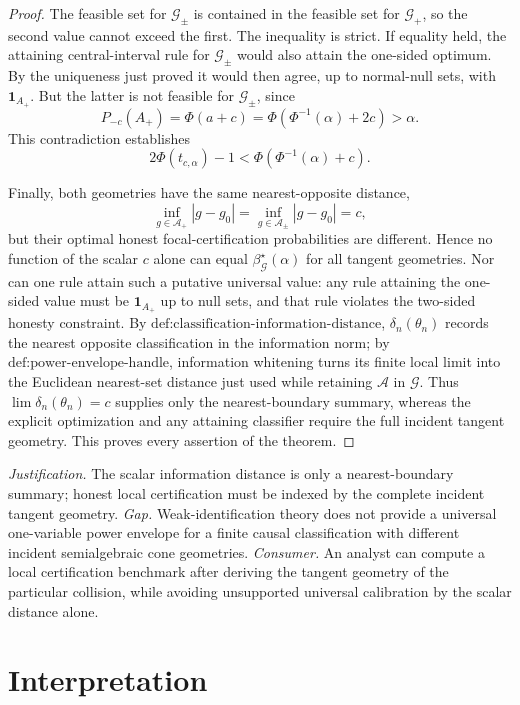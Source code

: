 \documentclass{article}
\begin{document}
\begin{proof}
The feasible set for \(\mathcal G_{\pm}\) is contained in the feasible set for \(\mathcal G_+\), so the second value cannot exceed the first.  The inequality is strict.  If equality held, the attaining central-interval rule for \(\mathcal G_{\pm}\) would also attain the one-sided optimum.  By the uniqueness just proved it would then agree, up to normal-null sets, with \(\mathbf 1_{A_+}\).  But the latter is not feasible for \(\mathcal G_{\pm}\), since
\[
 P_{-c}(A_+)
 =\Phi(a+c)
 =\Phi\!\left(\Phi^{-1}(\alpha)+2c\right)
 >\alpha.
\]
This contradiction establishes
\[
 2\Phi(t_{c,\alpha})-1
 <\Phi\!\left(\Phi^{-1}(\alpha)+c\right).
\]

Finally, both geometries have the same nearest-opposite distance,
\[
 \inf_{g\in\mathcal A_+}|g-g_0|
 =\inf_{g\in\mathcal A_{\pm}}|g-g_0|=c,
\]
but their optimal honest focal-certification probabilities are different.  Hence no function of the scalar \(c\) alone can equal \(\beta^{\star}_{\mathcal G}(\alpha)\) for all tangent geometries.  Nor can one rule attain such a putative universal value: any rule attaining the one-sided value must be \(\mathbf 1_{A_+}\) up to null sets, and that rule violates the two-sided honesty constraint.  By \(\text{def:classification-information-distance}\), \(\delta_n(\theta_n)\) records the nearest opposite classification in the information norm; by \(\text{def:power-envelope-handle}\), information whitening turns its finite local limit into the Euclidean nearest-set distance just used while retaining \(\mathcal A\) in \(\mathcal G\).  Thus \(\lim\delta_n(\theta_n)=c\) supplies only the nearest-boundary summary, whereas the explicit optimization and any attaining classifier require the full incident tangent geometry.  This proves every assertion of the theorem.
\end{proof}
\par\smallskip\noindent \textit{Justification.} The scalar information distance is only a nearest-boundary summary; honest local certification must be indexed by the complete incident tangent geometry. \textit{Gap.} Weak-identification theory does not provide a universal one-variable power envelope for a finite causal classification with different incident semialgebraic cone geometries. \textit{Consumer.} An analyst can compute a local certification benchmark after deriving the tangent geometry of the particular collision, while avoiding unsupported universal calibration by the scalar distance alone.

\section{Interpretation}
\end{document}
